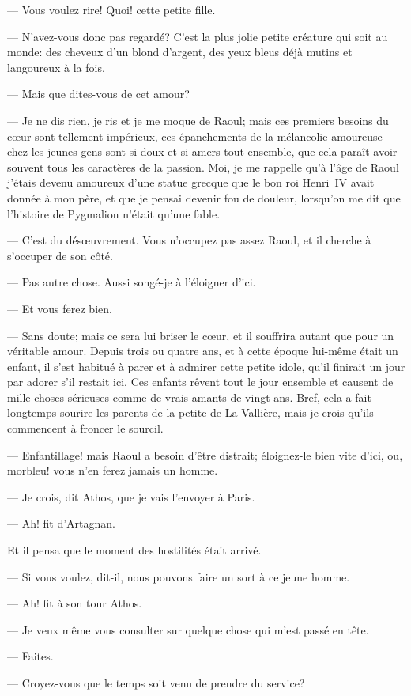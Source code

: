 — Vous voulez rire! Quoi! cette petite fille.

— N'avez-vous donc pas regardé? C'est la plus jolie petite créature qui soit au monde: des cheveux d'un blond d'argent, des yeux bleus déjà mutins et langoureux à la fois.

— Mais que dites-vous de cet amour?

— Je ne dis rien, je ris et je me moque de Raoul; mais ces premiers besoins du cœur sont tellement impérieux, ces épanchements de la mélancolie amoureuse chez les jeunes gens sont si doux et si amers tout ensemble, que cela paraît avoir souvent tous les caractères de la passion. Moi, je me rappelle qu'à l'âge de Raoul j'étais devenu amoureux d'une statue grecque que le bon roi Henri~IV avait donnée à mon père, et que je pensai devenir fou de douleur, lorsqu'on me dit que l'histoire de Pygmalion n'était qu'une fable.

— C'est du désœuvrement. Vous n'occupez pas assez Raoul, et il cherche à s'occuper de son côté.

— Pas autre chose. Aussi songé-je à l'éloigner d'ici.

— Et vous ferez bien.

— Sans doute; mais ce sera lui briser le cœur, et il souffrira autant que pour un véritable amour. Depuis trois ou quatre ans, et à cette époque lui-même était un enfant, il s'est habitué à parer et à admirer cette petite idole, qu'il finirait un jour par adorer s'il restait ici. Ces enfants rêvent tout le jour ensemble et causent de mille choses sérieuses comme de vrais amants de vingt ans. Bref, cela a fait longtemps sourire les parents de la petite de La Vallière, mais je crois qu'ils commencent à froncer le sourcil.

— Enfantillage! mais Raoul a besoin d'être distrait; éloignez-le bien vite d'ici, ou, morbleu! vous n'en ferez jamais un homme.

— Je crois, dit Athos, que je vais l'envoyer à Paris.

— Ah! fit d'Artagnan.

Et il pensa que le moment des hostilités était arrivé.

— Si vous voulez, dit-il, nous pouvons faire un sort à ce jeune homme.

— Ah! fit à son tour Athos.

— Je veux même vous consulter sur quelque chose qui m'est passé en tête.

— Faites.

— Croyez-vous que le temps soit venu de prendre du service?


